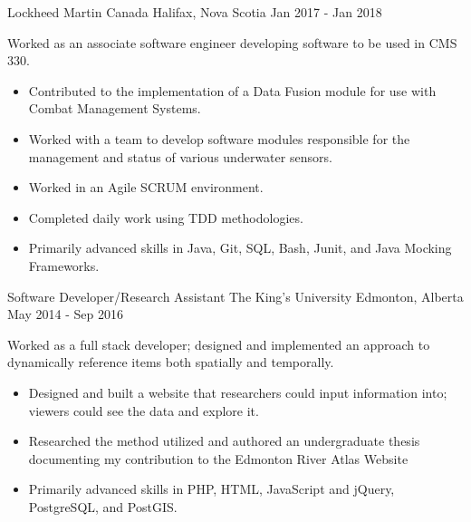 \begin{cventries}
        {Lockheed Martin Canada}
        {Halifax, Nova Scotia}
        {Jan 2017 - Jan 2018}
        {
            Worked as an associate software engineer developing software to be used in CMS 330.
            \begin{itemize}
                \item Contributed to the implementation of a Data Fusion module for use with Combat Management Systems.
                \item Worked with a team to develop software modules responsible for the management and status of various underwater sensors.
                \item Worked in an Agile SCRUM environment.
                \item Completed daily work using TDD methodologies.
                \item Primarily advanced skills in Java, Git, SQL, Bash, Junit, and Java Mocking Frameworks.
            \end{itemize}
        }
    \cventry
        {Software Developer/Research Assistant}
        {The King's University}
        {Edmonton, Alberta}
        {May 2014 - Sep 2016}
        {
            Worked as a full stack developer; designed and implemented an approach to dynamically reference items both spatially and temporally.
            \begin{itemize}
                \item Designed and built a website that researchers could input information into; viewers could see the data and explore it.
                \item Researched the method utilized and authored an undergraduate thesis documenting my contribution to the Edmonton River Atlas
                Website
                \item Primarily advanced skills in PHP, HTML, JavaScript and jQuery, PostgreSQL, and PostGIS.
            \end{itemize}
        }

\end{cventries}